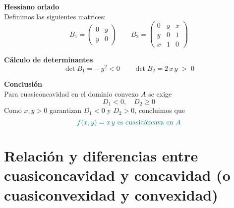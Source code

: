 \documentclass{article}
\begin{document}
\medskip

\noindent\textbf{Hessiano orlado}\\
Definimos las siguientes matrices:
\[
B_1 = 
\begin{pmatrix}
0 & y\\[4pt]
y & 0
\end{pmatrix}
\qquad
B_2 =
\begin{pmatrix}
0 & y & x\\[4pt]
y & 0 & 1\\[4pt]
x & 1 & 0
\end{pmatrix}
\]

\medskip

\noindent\textbf{Cálculo de determinantes}\\
\[
\det B_1 = -\,y^2<0
\qquad
\det B_2 = 2\,x\,y \;>\;0
\]

\medskip

\noindent\textbf{Conclusión}\\
Para cuasiconcavidad en el dominio convexo \(A\) se exige
\[
D_1 <0,\quad D_2\ge0
\]
Como \(x,y>0\) garantizan \(D_1<0\) y \(D_2>0\), concluimos que
\[
\color{teal}
f(x,y)=x\,y\text{ es cuasicóncava en }A
\]






\section*{Relación y diferencias entre cuasiconcavidad y concavidad (o cuasiconvexidad y convexidad)}
\end{document}
